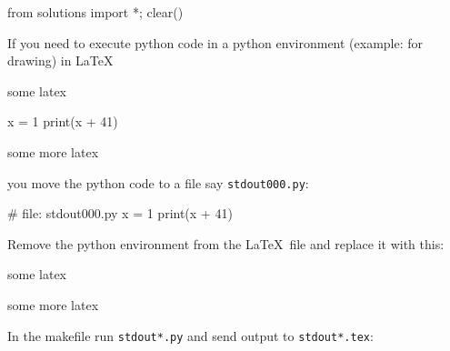 \begin{python0}
from solutions import *; clear()
\end{python0}

If you need to execute python code in a
python environment (example: for drawing) in \LaTeX\: 
\begin{console}
some latex
\begin{python}
x = 1
print(x + 41)
\end{python}
some more latex
\end{console}
you move the python code to a file say \verb!stdout000.py!:
\begin{console}
# file: stdout000.py
x = 1
print(x + 41)
\end{console}
Remove the python environment from the \LaTeX\ file and replace it with
this:
\begin{console}
some latex

some more latex
\end{console}
In the makefile run \verb!stdout*.py! and send output to \verb!stdout*.tex!:
